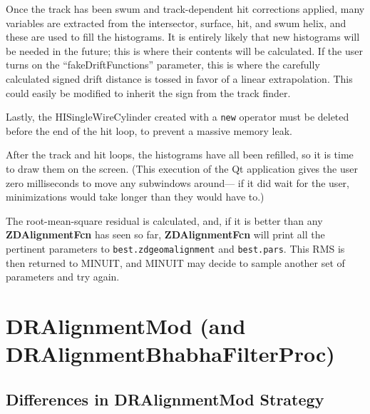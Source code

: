 \documentclass[12pt]{article}
\begin{document}
Once the track has been swum and track-dependent hit corrections
applied, many variables are extracted from the intersector, surface,
hit, and swum helix, and these are used to fill the histograms.  It is
entirely likely that new histograms will be needed in the future; this
is where their contents will be calculated.  If the user turns on the
``fakeDriftFunctions'' parameter, this is where the carefully
calculated signed drift distance is tossed in favor of a linear
extrapolation.  This could easily be modified to inherit the sign from
the track finder.

Lastly, the HISingleWireCylinder created with a {\tt new} operator
must be deleted before the end of the hit loop, to prevent a massive
memory leak.

After the track and hit loops, the histograms have all been refilled,
so it is time to draw them on the screen.  (This execution of the Qt
application gives the user zero milliseconds to move any subwindows
around--- if it did wait for the user, minimizations would take longer
than they would have to.)

The root-mean-square residual is calculated, and, if it is better than
any {\bf ZDAlignmentFcn} has seen so far, {\bf ZDAlignmentFcn} will
print all the pertinent parameters to {\tt best.zdgeomalignment} and
{\tt best.pars}.  This RMS is then returned to MINUIT, and MINUIT may
decide to sample another set of parameters and try again.

\section{DRAlignmentMod {\normalsize (and DRAlignmentBhabhaFilterProc)}}

\subsection{Differences in DRAlignmentMod Strategy}
\end{document}
